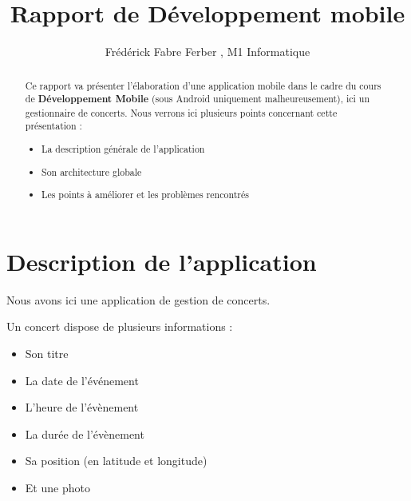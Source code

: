 \documentclass{article}
\title{Rapport de Développement mobile}
\author{Frédérick Fabre Ferber , M1 Informatique}
\begin{document}
\maketitle

\begin{abstract}
Ce rapport va présenter l'élaboration d'une application mobile dans le cadre du cours de \textbf{Développement Mobile} (sous Android uniquement malheureusement), ici un gestionnaire de concerts.
 Nous verrons ici plusieurs points concernant cette présentation :
\begin{itemize}
\item La description générale de l'application
\item Son architecture globale
\item Les points à améliorer et les problèmes rencontrés
\end{itemize}
\end{abstract}

\section{Description de l'application}
\label{section:Description de l'application}

Nous avons ici une application de gestion de concerts. 

Un concert dispose de plusieurs informations :
\begin{itemize}
\item Son titre 
\item La date de l’événement
\item L'heure de l'évènement 
\item La durée de l'évènement
\item Sa position (en latitude et longitude)
\item Et une photo
\end{itemize}
\end{document}
